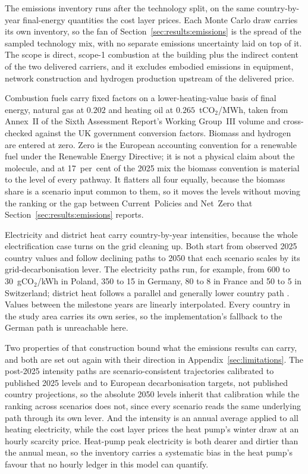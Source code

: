The emissions inventory runs after the technology split, on the same
country-by-year final-energy quantities the cost layer prices. Each Monte Carlo draw
carries its own inventory, so the fan of Section~\ref{sec:results:emissions} is the spread of the sampled
technology mix, with no separate emissions uncertainty laid on top of it.
The scope is direct, scope-1 combustion at the building plus the indirect content of the
two delivered carriers, and it excludes embodied emissions in equipment, network
construction and hydrogen production upstream of the delivered price.

Combustion fuels carry fixed factors on a lower-heating-value basis of final energy,
natural gas at $0.202$ and heating oil at $0.265$~tCO$_2$/MWh, taken from Annex~II of the Sixth Assessment Report's Working Group~III volume and cross-checked against the UK government conversion factors. Biomass and hydrogen are entered at zero. Zero is the European accounting convention for a renewable fuel under the Renewable
Energy Directive; it is not a physical claim about the molecule, and at 17~per~cent of the 2025 mix the biomass
convention is material to the level of every pathway. It flatters all four equally,
because the biomass share is a scenario input common to them, so it moves the levels
without moving the ranking or the gap between Current~Policies and Net~Zero that
Section~\ref{sec:results:emissions} reports.

Electricity and district heat carry country-by-year intensities, because the whole
electrification case turns on the grid cleaning up. Both start from
observed 2025 country values \citep{EMBER2024electricity} and follow declining paths to
2050 that each scenario scales by its grid-decarbonisation lever. The electricity paths
run, for example, from 600 to 30~gCO$_2$/kWh in Poland, 350 to 15 in Germany, 80 to 8 in
France and 50 to 5 in Switzerland; district heat follows a parallel and generally lower
country path \citep{EEA2023fit55}. Values between the milestone years are linearly interpolated. Every country in the study
area carries its own series, so the implementation's fallback to the German path is
unreachable here.

Two properties of that construction bound what the emissions results can carry, and both
are set out again with their direction in Appendix~\ref{sec:limitations}. The post-2025
intensity paths are scenario-consistent trajectories calibrated to published 2025 levels
and to European decarbonisation targets, not published country projections, so the
absolute 2050 levels inherit that calibration while the ranking across scenarios does not,
since every scenario reads the same underlying path through its own lever. And the
intensity is an annual average applied to all heating electricity, while the cost layer
prices the heat pump's winter draw at an hourly scarcity price. Heat-pump peak electricity
is both dearer and dirtier than the annual mean, so the inventory carries a systematic
bias in the heat pump's favour that no hourly ledger in this model can quantify.

